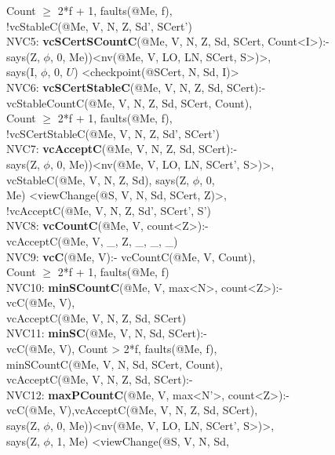 \begin{code}
\> Count $\geq$ 2*f + 1, faults(@Me, f),\\
\> !vcStableC(@Me, V, N, Z, Sd', SCert')\\
NVC5: \textbf{vcSCertSCountC}(@Me, V, N, Z, Sd, SCert, Count<I>):- \\
\> says(Z, $\phi$, 0, Me))<nv(@Me, V, LO, LN, SCert, S>)>,\\
\> says(I, $\phi$, 0, $U$) <checkpoint(@SCert, N, Sd, I)>\\
NVC6: \textbf{vcSCertStableC}(@Me, V, N, Z, Sd, SCert):-\\
\> vcStableCountC(@Me, V, N, Z, Sd, SCert, Count),\\
\> Count $\geq$ 2*f + 1, faults(@Me, f),\\
\> !vcSCertStableC(@Me, V, N, Z, Sd', SCert')\\
NVC7: \textbf{vcAcceptC}(@Me, V, N, Z, Sd, SCert):-\\
\> says(Z, $\phi$, 0, Me))<nv(@Me, V, LO, LN, SCert', S>)>,\\
\> vcStableC(@Me, V, N, Z, Sd), says(Z, $\phi$, 0, \\
\> Me) <viewChange(@S, V, N, Sd, SCert, Z)>,\\
\> !vcAcceptC(@Me, V, N, Z, Sd', SCert', S')\\
NVC8: \textbf{vcCountC}(@Me, V, count<Z>):-\\
\> vcAcceptC(@Me, V, \_, Z, \_, \_, \_)\\
NVC9: \textbf{vcC}(@Me, V):- vcCountC(@Me, V, Count),\\
\> Count $\geq$ 2*f + 1, faults(@Me, f)\\
NVC10: \textbf{minSCountC}(@Me, V, max<N>, count<Z>):- \\
\> vcC(@Me, V),\\
\> vcAcceptC(@Me, V, N, Z, Sd, SCert)\\
NVC11: \textbf{minSC}(@Me, V, N, Sd, SCert):- \\
\> vcC(@Me, V), Count > 2*f, faults(@Me, f),\\
\> minSCountC(@Me, V, N, Sd, SCert, Count), \\
\> vcAcceptC(@Me, V, N, Z, Sd, SCert):-\\
NVC12: \textbf{maxPCountC}(@Me, V, max<N'>, count<Z>):- \\
\> vcC(@Me, V),vcAcceptC(@Me, V, N, Z, Sd, SCert),\\
\> says(Z, $\phi$, 0, Me))<nv(@Me, V, LO, LN, SCert', S>)>,\\
\> says(Z, $\phi$, 1, Me) <viewChange(@S, V, N, Sd, \\

\end{code}
